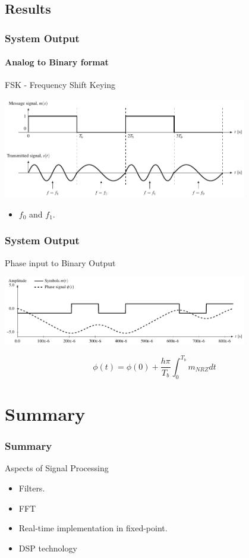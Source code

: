 \subsection{Results}
\begin{frame} \frametitle{System Output}
    \framesubtitle{Analog to Binary format}
    \begin{block}{FSK - Frequency Shift Keying}    
        \begin{center}
            \includegraphics[width=0.8\textwidth]{img/gfsk_basics}
        \end{center}
        \begin{itemize}
            \item $f_0$ and $f_1$.
        \end{itemize}
    \end{block}
\end{frame}
%
\begin{frame}\frametitle{System Output}
    \begin{block}{Phase input to Binary Output} 
        \begin{center}
            \includegraphics[width=0.8\textwidth]{img/gfsk_integration} 
        \end{center}
        \begin{equation}
            \phi(t) = \phi(0) + \frac{h \pi}{T_b}\int_0^{T_b} m_{NRZ}dt
        \end{equation}
    \end{block}
\end{frame}

\section{Summary}
\begin{frame}\frametitle{Summary}
    \begin{block}{Aspects of Signal Processing} 
     \begin{itemize}
         \item Filters.
         \item FFT
         \item Real-time implementation in fixed-point.
         \item DSP technology
     \end{itemize}
    \end{block}
\end{frame}

